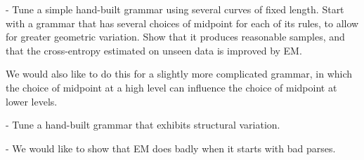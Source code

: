   - Tune a simple hand-built grammar using several curves of fixed
    length. Start with a grammar that has several choices of midpoint
    for each of its rules, to allow for greater geometric
    variation. Show that it produces reasonable samples, and that the
    cross-entropy estimated on unseen data is improved by EM.

    We would also like to do this for a slightly more complicated
    grammar, in which the choice of midpoint at a high level can
    influence the choice of midpoint at lower levels.

  - Tune a hand-built grammar that exhibits structural variation.

  - We would like to show that EM does badly when it starts with bad
    parses.

